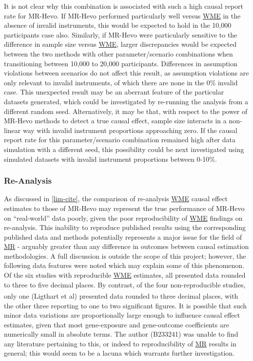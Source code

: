 \documentclass[
]{article}
\begin{document}
It is not clear why this combination is associated with such a high causal report rate for MR-Hevo. If MR-Hevo performed particularly well versus \hyperref[acronyms_WME]{WME} in the absence of invalid instruments, this would be expected to hold in the 10,000 participants case also. Similarly, if MR-Hevo were particularly sensitive to the difference in sample size versus \hyperref[acronyms_WME]{WME}, larger discrepancies would be expected between the two methods with other parameter/scenario combinations when transitioning between 10,000 to 20,000 participants. Differences in assumption violations between scenarios do not affect this result, as assumption violations are only relevant to invalid instruments, of which there are none in the 0\% invalid case. This unexpected result may be an aberrant feature of the particular datasets generated, which could be investigated by re-running the analysis from a different random seed. Alternatively, it may be that, with respect to the power of MR-Hevo methods to detect a true causal effect, sample size interacts in a non-linear way with invalid instrument proportions approaching zero. If the causal report rate for this parameter/scenario combination remained high after data simulation with a different seed, this possibility could be next investigated using simulated datasets with invalid instrument proportions between 0-10\%.

\subsubsection{Re-Analysis}\label{re-analysis}

As discussed in \ref{lim-cite}, the comparison of re-analysis \hyperref[acronyms_WME]{WME} causal effect estimates to those of MR-Hevo may represent the true performance of MR-Hevo on ``real-world'' data poorly, given the poor reproducibility of \hyperref[acronyms_WME]{WME} findings on re-analysis. This inability to reproduce published results using the corresponding published data and methods potentially represents a major issue for the field of \hyperref[acronyms_MR]{MR} - arguably greater than any difference in outcomes between causal estimation methodologies. A full discussion is outside the scope of this project; however, the following data features were noted which may explain some of this phenomenon. Of the six studies with reproducible \hyperref[acronyms_WME]{WME} estimates, all presented data rounded to three to five decimal places. By contrast, of the four non-reproducible studies, only one (Ligthart et al\textsuperscript{}) presented data rounded to three decimal places, with the other three reporting to one to two significant figures. It is possible that such minor data variations are proportionally large enough to influence causal effect estimates, given that most gene-exposure and gene-outcome coefficients are numerically small in absolute terms. The author (B233241) was unable to find any literature pertaining to this, or indeed to reproducibility of \hyperref[acronyms_MR]{MR} results in general; this would seem to be a lacuna which warrants further investigation.
\end{document}
